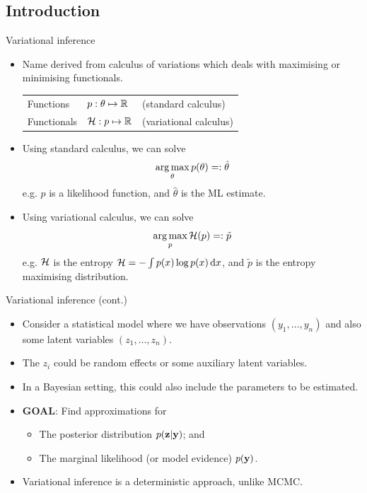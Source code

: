 \subsection{Introduction}

\begin{frame}{Variational inference}
  \vspace{-10pt}
  \begin{itemize}
    \item Name derived from calculus of variations which deals with maximising or minimising functionals.
    \begin{table}
      \begin{tabular}{l  l  l }
      Functions   &$p:\theta \mapsto \mathbb{R}$  &(standard calculus) \\ 
      Functionals &${\mathcal H}:p \mapsto \mathbb{R}$     &(variational calculus) \\ 
      \end{tabular}
    \end{table}
  \item Using standard calculus, we can solve
  \[
    \operatorname*{arg\,max}_\theta p(\theta) =: \hat\theta
  \]
  e.g. $p$ is a likelihood function, and $\hat\theta$ is the ML estimate.
  \item Using variational calculus, we can solve
  \[
    \operatorname*{arg\,max}_p {\mathcal H}(p) =: \tilde p
  \]
  e.g. ${\mathcal H}$ is the entropy ${\mathcal H} = - \int p(x)\log p(x) \, \text{d} x$, and $\tilde p$ is the entropy maximising distribution.
  \end{itemize}
  \vspace{5pt}
\end{frame}

\begin{frame}{Variational inference (cont.)}
  \vspace{-5pt}
  \begin{itemize}\setlength\itemsep{0.8em}
    \item Consider a statistical model where we have observations $(y_1, \dots, y_n)$ and also some latent variables $(z_1, \dots, z_n)$.
    \item The $z_i$ could be random effects or some auxiliary latent variables.
    \item In a Bayesian setting, this could also include the parameters to be estimated.
    \item \textbf{GOAL}: Find approximations for
    \begin{itemize}
      \item The posterior distribution $p({\mathbf z}|{\mathbf y})$; and
      \item The marginal likelihood (or model evidence) $p({\mathbf y})$.
    \end{itemize}
    \item Variational inference is a deterministic approach, unlike MCMC.
  \end{itemize}
\end{frame}

